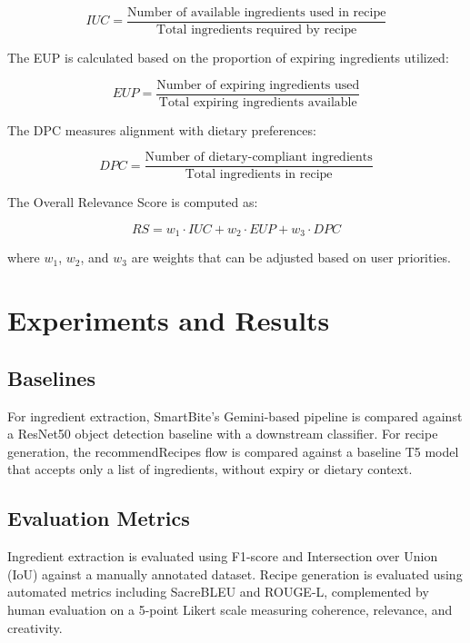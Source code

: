 \documentclass[conference]{IEEEtran}
\begin{document}
\begin{equation}
IUC = \frac{\text{Number of available ingredients used in recipe}}{\text{Total ingredients required by recipe}}
\end{equation}

The EUP is calculated based on the proportion of expiring ingredients utilized:

\begin{equation}
EUP = \frac{\text{Number of expiring ingredients used}}{\text{Total expiring ingredients available}}
\end{equation}

The DPC measures alignment with dietary preferences:

\begin{equation}
DPC = \frac{\text{Number of dietary-compliant ingredients}}{\text{Total ingredients in recipe}}
\end{equation}

The Overall Relevance Score is computed as:

\begin{equation}
RS = w_1 \cdot IUC + w_2 \cdot EUP + w_3 \cdot DPC
\end{equation}

where $w_1$, $w_2$, and $w_3$ are weights that can be adjusted based on user priorities.

\section{Experiments and Results}

\subsection{Baselines}

For ingredient extraction, SmartBite's Gemini-based pipeline is compared against a ResNet50 object detection baseline with a downstream classifier. For recipe generation, the recommendRecipes flow is compared against a baseline T5 model that accepts only a list of ingredients, without expiry or dietary context.

\subsection{Evaluation Metrics}

Ingredient extraction is evaluated using F1-score and Intersection over Union (IoU) against a manually annotated dataset. Recipe generation is evaluated using automated metrics including SacreBLEU and ROUGE-L, complemented by human evaluation on a 5-point Likert scale measuring coherence, relevance, and creativity.
\end{document}
